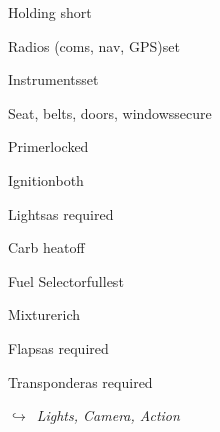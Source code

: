 \begin{multicols}{2}
\begin{checklist}{Holding short}
    \item{Radios (coms, nav, GPS)}{set}
    \item{Instruments}{set}
    \item{Seat, belts, doors, windows}{secure}
    \item{Primer}{locked}
    \item{Ignition}{both}
    \item{Lights}{as required}
    \item{Carb heat}{off}
    \item{Fuel Selector}{fullest}
    \item{Mixture}{rich}
    \item{Flaps}{as required}
    \item{Transponder}{as required}
\end{checklist}

\noindent$\hookrightarrow$\ \textit{Lights, Camera, Action}

\end{multicols}
